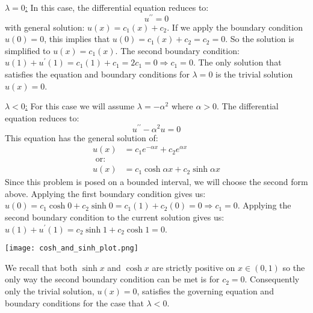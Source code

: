 \vspace{0.5cm}

\noindent \underline{$\lambda = 0$:}  In this case, the differential equation reduces to:
\begin{equation*}
u^{\prime \prime} = 0
\end{equation*}
with general solution: $u(x) = c_1(x) + c_2$.  If we apply the boundary condition $u(0) = 0$, this implies that $u(0) = c_1(x) + c_2 = c_2 = 0$. So the solution is simplified to $u(x) = c_1(x)$.  The second boundary condition: $u(1) + u^{\prime}(1) = c_1(1) + c_1 = 2c_1 = 0 \Rightarrow c_1 = 0$. The only solution that satisfies the equation and boundary conditions for $\lambda = 0$ is the trivial solution $u(x) = 0$.

\vspace{4.5cm}

\noindent\underline{$\lambda < 0$:}  For this case we will assume $\lambda = -\alpha^2$ where $\alpha > 0$.  The differential equation reduces to:
\begin{equation*}
u^{\prime \prime} - \alpha^2u = 0
\end{equation*}
This equation has the general solution of:
\begin{align*}
u(x) &= c_1e^{-\alpha x} + c_2e^{\alpha x} \\
\text{ or: } & \\
u(x) &=c_1 \cosh{\alpha x} + c_2 \sinh{\alpha x} 
\end{align*}
Since this problem is posed on a bounded interval, we will choose the second form above.  Applying the first boundary condition gives us: $u(0) = c_1\cosh{0} + c_2\sinh{0} = c_1(1) + c_2(0) = 0 \Rightarrow c_1 = 0$.  Applying the second boundary condition to the current solution gives us: $u(1) + u^{\prime}(1) = c_2\sinh{1} + c_2\cosh{1} = 0$. \begin{marginfigure} \texttt{[image: cosh\_and\_sinh\_plot.png]} \end{marginfigure}  
We recall that both $\sinh{x}$ and $\cosh{x}$ are strictly positive on $x\in(0,1)$ so the only way the second boundary condition can be met is for $c_2 = 0$.  Consequently only the trivial solution, $u(x) = 0$, satisfies the governing equation and boundary conditions for the case that $\lambda < 0$.


